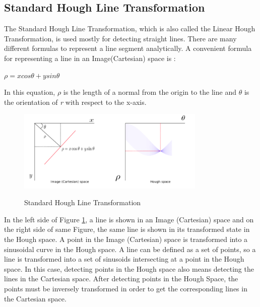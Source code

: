 \subsection{Standard Hough Line Transformation}\label{sec:Standard Hough Line Transformation}
%
The Standard Hough Line Transformation, which is also called the Linear Hough Transformation, is used mostly for detecting straight lines. There are many different formulas to represent a line segment analytically. A convenient formula for representing a line in an Image(Cartesian) space is :

  \begin{center}

$ \rho = x cos \theta + y sin \theta $

  \end{center}
  
In this equation, \textit{$ \rho $} is the length of a normal from the origin to the line and \textit{$ \theta $} is the orientation of \textit{r} with respect to the x-axis.
 
 
 \begin{figure}[H]
 \centering
  \includegraphics[width=0.8\textwidth]{./Bilder/Standard_Hough_Line_Transformation.png}\label{Standard_Hough_Line_Transformation_fig}
  \caption{Standard Hough Line Transformation\cite{Standard_Hough_Transformation}}
\end{figure}
 
 In the left side of Figure \ref{Standard_Hough_Line_Transformation_fig}, a line is shown in an Image (Cartesian) space and on the right side of same Figure, the same line is shown in its transformed state in the Hough space. A point in the Image (Cartesian) space is transformed into a sinusoidal curve in the Hough space. A line can be defined as a set of points, so a line is transformed into a set of sinusoids intersecting at a point in the Hough space. In this case, detecting points in the Hough space also means detecting the lines in the Cartesian space. After detecting points in the Hough Space, the points must be inversely transformed in order to get the corresponding lines in the Cartesian space.
 
